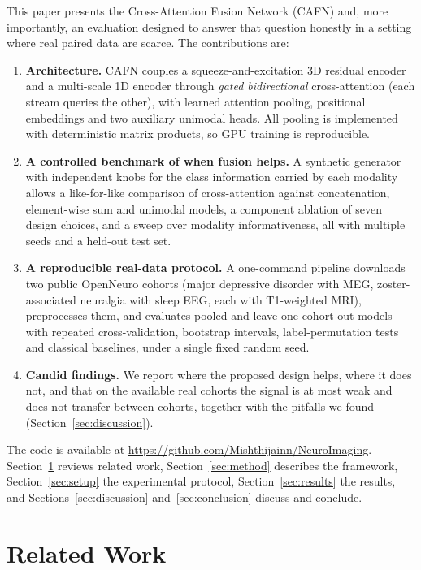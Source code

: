 \documentclass{ieeeaccessapprox}
\begin{document}
This paper presents the Cross-Attention Fusion Network (CAFN) and, more importantly, an evaluation designed to answer that question honestly in a setting where real paired data are scarce. The contributions are:
\begin{enumerate}
\item \textbf{Architecture.} CAFN couples a squeeze-and-excitation 3D residual encoder and a multi-scale 1D encoder through \emph{gated bidirectional} cross-attention (each stream queries the other), with learned attention pooling, positional embeddings and two auxiliary unimodal heads. All pooling is implemented with deterministic matrix products, so GPU training is reproducible.
\item \textbf{A controlled benchmark of when fusion helps.} A synthetic generator with independent knobs for the class information carried by each modality allows a like-for-like comparison of cross-attention against concatenation, element-wise sum and unimodal models, a component ablation of seven design choices, and a sweep over modality informativeness, all with multiple seeds and a held-out test set.
\item \textbf{A reproducible real-data protocol.} A one-command pipeline downloads two public OpenNeuro cohorts (major depressive disorder with MEG, zoster-associated neuralgia with sleep EEG, each with T1-weighted MRI), preprocesses them, and evaluates pooled and leave-one-cohort-out models with repeated cross-validation, bootstrap intervals, label-permutation tests and classical baselines, under a single fixed random seed.
\item \textbf{Candid findings.} We report where the proposed design helps, where it does not, and that on the available real cohorts the signal is at most weak and does not transfer between cohorts, together with the pitfalls we found (Section~\ref{sec:discussion}).
\end{enumerate}
The code is available at \url{https://github.com/Mishthijainn/NeuroImaging}. Section~\ref{sec:related} reviews related work, Section~\ref{sec:method} describes the framework, Section~\ref{sec:setup} the experimental protocol, Section~\ref{sec:results} the results, and Sections~\ref{sec:discussion} and~\ref{sec:conclusion} discuss and conclude.

\section{Related Work}\label{sec:related}
\end{document}
